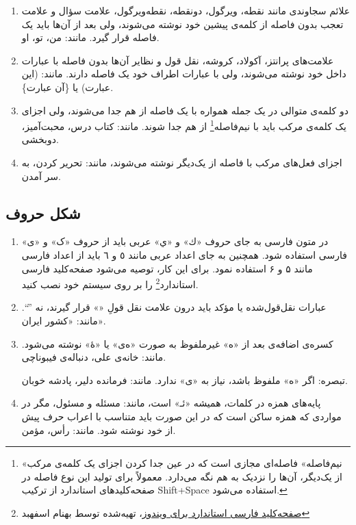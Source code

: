 \begin{enumerate}

\item
علائم سجاوندی مانند نقطه، ویرگول، دونقطه، نقطه‌ویرگول، علامت سؤال و علامت تعجب %
بدون فاصله از کلمه‌ی پیشین خود نوشته می‌شوند، ولی بعد از آن‌ها باید یک فاصله‌ قرار گیرد. مانند: من، تو، او.
\item
علامت‌های پرانتز، آکولاد، کروشه، نقل قول و نظایر آن‌ها بدون فاصله با عبارات داخل خود نوشته می‌شوند، ولی با عبارات اطراف خود یک فاصله دارند. مانند: (این عبارت) یا \{آن عبارت\}.
\item
دو کلمه‌ی متوالی در یک جمله همواره با یک فاصله از هم جدا می‌شوند، ولی اجزای یک کلمه‌ی مرکب باید با نیم‌فاصله\footnote{«نیم‌فاصله» فاصله‌‌ای مجازی است که در عین جدا کردن اجزای یک کلمه‌ی مرکب از یک‌دیگر، آن‌ها را نزدیک به هم نگه می‌دارد. معمولاً برای تولید این نوع فاصله در صفحه‌کلید‌های استاندارد از ترکیب Shift+Space استفاده می‌شود.}‌‌
 از هم جدا شوند. مانند: کتاب درس، محبت‌آمیز، دوبخشی.
 \item
 اجزای فعل‌های مرکب با فاصله از یک‌دیگر نوشته می‌شوند، مانند: تحریر کردن، به سر آمدن.
\end{enumerate}


\subsection{شکل حروف}

\begin{enumerate}

\item
در متون فارسی به جای حروف «ك» و «ي» عربی باید از حروف «ک» و «ی» فارسی استفاده شود. همچنین به جای اعداد عربی مانند ٥ و ٦ باید از اعداد فارسی مانند ۵ و ۶ استفاده نمود.
برای این کار، توصیه می‌شود صفحه‌کلید‌ فارسی استاندارد\footnote{\href{http://persian-computing.ir/download/Iranian_Standard_Persian_Keyboard_(ISIRI_9147)_(Version_2.0).zip}{صفحه‌کلید فارسی استاندارد برای ویندوز}، تهیه‌شده توسط بهنام اسفهبد} را بر روی سیستم خود نصب کنید.
\item
عبارات نقل‌قول‌شده یا مؤکد باید درون علامت نقل قولِ «» قرار گیرند، نه ''``. مانند: «کشور ایران».
\item
کسره‌ی اضافه‌ی بعد از «ه» غیرملفوظ به صورت «ه‌ی» یا «هٔ» نوشته می‌شود. مانند: خانه‌ی علی، دنباله‌ی فیبوناچی.

        تبصره‌: اگر «ه» ملفوظ باشد، نیاز به «‌ی» ندارد. مانند: فرمانده دلیر، پادشه خوبان.

\item
پایه‌های همزه در کلمات، همیشه «ئـ» است، مانند: مسئله و مسئول، مگر در مواردی که همزه ساکن است که در این ‌صورت باید متناسب با اعراب حرف پیش از خود نوشته شود. مانند: رأس، مؤمن.

\end{enumerate}


